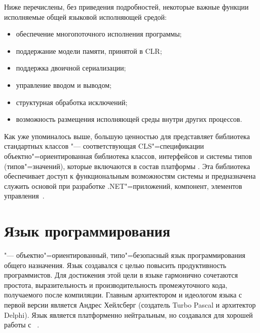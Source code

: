 Ниже перечислены, без приведения подробностей, некоторые важные функции исполняемые общей языковой исполняющей средой:
\begin{itemize}
  \item обеспечение многопоточного исполнения программы;
  \item поддержание модели памяти, принятой в CLR;
  \item поддержка двоичной сериализации;
  \item управление вводом и выводом;
  \item структурная обработка исключений;
  \item возможность размещения исполняющей среды внутри других процессов.
\end{itemize}

Как уже упоминалось выше, большую ценностью для \dotnet{} представляет библиотека стандартных классов "--- соответствующая CLS"=спецификации объектно"=ориентированная библиотека классов, интерфейсов и системы типов (типов"=значений), которые включаются в состав платформы \dotnet{}.
Эта библиотека обеспечивает доступ к функциональным возможностям системы и предназначена служить основой при разработке .NET"=приложений, компонент, элементов управления~\cite{marchenko_2007}.



\section{Язык программирования \csharp{}}
\label{sub:practice:csharp_overview}
\csharp{} "--- объектно"=ориентированный, типо"=безопасный язык программирования общего назначения.
Язык создавался с целью повысить продуктивность программистов.
Для достижения этой цели в языке гармонично сочетаются простота, выразительность и производительность промежуточного кода, получаемого после компиляции.
Главным архитектором и идеологом языка с первой версии является Андрес Хейлсберг (создатель Turbo Pascal и архитектор Delphi).
Язык \csharp{} является платформенно нейтральным, но создавался для хорошей работы с \dotnet{}~\cite{albahari_2012_en}.

